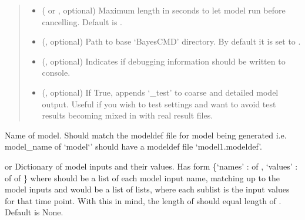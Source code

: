 \documentclass[letterpaper,10pt,english]{sphinxmanual}
\begin{document}
\begin{fulllineitems}
\begin{quote}
\begin{description}
\begin{itemize}
\item {} 
 ( or , optional) \textendash{} Maximum length in seconds to let model run before cancelling. Default
is {\hyperref[\detokenize{bcmdModel:bayescmd.bcmdModel.bcmd_model.TIMEOUT}]{}}.

\item {} 
 (, optional) \textendash{} Path to base ‘BayesCMD’ directory. By default it is set to
{\hyperref[\detokenize{bcmdModel:bayescmd.bcmdModel.bcmd_model.BASEDIR}]{}}.

\item {} 
 (, optional) \textendash{} Indicates if debugging information should be written to console.

\item {} 
 (, optional) \textendash{} If True, appends ‘\_test’ to coarse and detailed model output. Useful
if you wish to test settings and want to avoid test results becoming
mixed in with real result files.

\end{itemize}

\end{description}\end{quote}

\begin{fulllineitems}
\label{\detokenize{bcmdModel:bayescmd.bcmdModel.bcmd_model.ModelBCMD.model_name}}
 \textendash{} Name of model. Should match the modeldef file for model being generated
i.e. model\_name of ‘model{}`’ should have a modeldef file
‘model1.modeldef’.

\end{fulllineitems}


\begin{fulllineitems}
\label{\detokenize{bcmdModel:bayescmd.bcmdModel.bcmd_model.ModelBCMD.inputs}}
 or  \textendash{} Dictionary of model inputs and their values. Has form
\{‘names’ :  of ,
‘values’ :  of  of \}
where  should be a list of each model input name, matching up to
the model inputs and  would be a list of lists, where each
sublist is the input values for that time point. With this in mind,
the length of  should equal length of .
Default is None.


\end{fulllineitems}
\end{fulllineitems}
\end{document}
